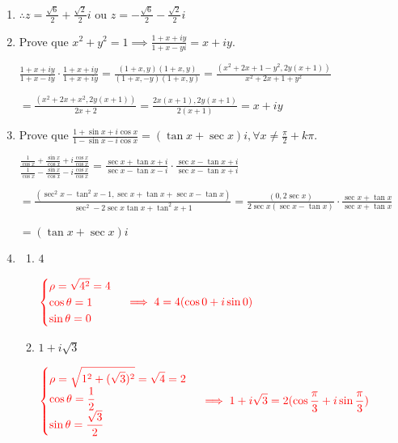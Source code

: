 \documentclass[12pt, openright, a4paper, twoside, english, brazil]{article}
\newenvironment{qitem}{
  \color{black}
\item}{\vspace{10pt}}
\newenvironment{qmitem}{
  \color{black}
\item
\begin{enumerate}[\bfseries a)]}{
\end{enumerate}\vspace{10pt}}
\newcommand{\cis}[1]{\displaystyle(\cos#1+i\sin#1)}
\begin{document}
\begin{enumerate}[\bfseries 1.]
\begin{qitem}
    $\displaystyle\therefore
    z=\frac{\sqrt{6}}{2}+\frac{\sqrt{2}}{2}i$ ou $\displaystyle
    z=-\frac{\sqrt{6}}{2}-\frac{\sqrt{2}}{2}i$
  \end{qitem}

  \begin{qitem} %
    Prove que $\displaystyle x^2+y^2=1\implies \frac{1+x+iy}{1+x-yi}=x+iy$.

    \color{red}
    $\displaystyle
    \frac{1+x+iy}{1+x-iy}\cdot\frac{1+x+iy}{1+x+iy}=\frac{(1+x,y)(1+x,y)}{(1+x,-y)(1+x,y)}=\frac{(x^2+2x+1-y^2,2y(x+1))}{x^2+2x+1+y^2}$

    $\displaystyle
    =\frac{(x^2+2x+x^2,2y(x+1))}{2x+2}=\frac{2x(x+1),2y(x+1)}{2(x+1)}=x+iy$
  \end{qitem}

  \begin{qitem} %
    Prove que $\displaystyle \frac{1+\sin x+i\cos x}{1-\sin x-i\cos
    x}=(\tan x+\sec x)i,\forall x\ne\frac{\pi}{2}+k\pi$.

    \color{red}
    $\displaystyle \frac{\displaystyle\frac{1}{\cos x}+\frac{\sin x}{\cos
    x}+i\frac{\cos x}{\cos x}}{\displaystyle\frac{1}{\cos x}-\frac{\sin x}{\cos
    x}-i\frac{\cos x}{\cos x}}=\frac{\sec x+\tan x +i}{\sec x-\tan
    x-i}\cdot\frac{\sec x-\tan x+i}{\sec x-\tan x+i}$

    $\displaystyle=\frac{(\sec^2 x-\tan^2x-1,\sec x+\tan x+\sec
    x-\tan x)}{\sec^2-2\sec x\tan x+\tan^2x+1}=\frac{(0, 2\sec
    x)}{2\sec x(\sec x-\tan x)}\cdot\frac{\sec x+\tan x}{\sec x +\tan x}$

    $=(\tan x+\sec x)i$
  \end{qitem}

  \newcommand{\rhocis}[4]{$\color{red}
    \begin{cases}\rho=\displaystyle#1\\\cos\theta=\displaystyle#2\\\sin\theta=\displaystyle#3
  \end{cases}\implies\displaystyle #4\color{black}$}

  \begin{qmitem} %
  \item $4$

    \rhocis{\sqrt{4^2}=4}{1}{0}{4=4\cis0}

  \item $1+i\sqrt3$

    \rhocis{\sqrt{1^2+(\sqrt{3})^2}=\sqrt{4}=2}{\frac{1}{2}}{\frac{\sqrt{3}}{2}}{1+i\sqrt{3}=2\cis{\displaystyle\frac{\pi}{3}}}


\end{qmitem}
\end{enumerate}
\end{document}
